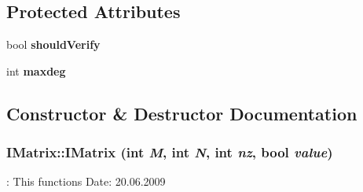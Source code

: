 \begin{DoxyCompactItemize}
\end{DoxyCompactItemize}
\subsection*{Protected Attributes}
\begin{DoxyCompactItemize}
\item 
\hypertarget{classIMatrix_a131c3e77ce7a03f2655a633b147c07f9}{
bool {\bfseries shouldVerify}}
\label{classIMatrix_a131c3e77ce7a03f2655a633b147c07f9}

\item 
\hypertarget{classIMatrix_a64cd0699662ea81465c3b356e84cceab}{
int {\bfseries maxdeg}}
\label{classIMatrix_a64cd0699662ea81465c3b356e84cceab}

\end{DoxyCompactItemize}


\subsection{Constructor \& Destructor Documentation}
\hypertarget{classIMatrix_afe2001929e7328d988dc1d85c0d18c27}{
\subsubsection[{IMatrix}]{\setlength{\rightskip}{0pt plus 5cm}IMatrix::IMatrix (int {\em M}, \/  int {\em N}, \/  int {\em nz}, \/  bool {\em value})}}
\label{classIMatrix_afe2001929e7328d988dc1d85c0d18c27}
: This functions  Date: 20.06.2009 

